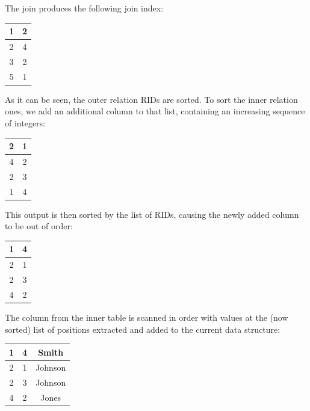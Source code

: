 \noindent The join produces the following join index:
\begin{table}[H]
    \centering
    \begin{tabular}{|c||c|}
    \hline
        1 & 2 \\
    \hline
        2 & 4 \\
    \hline
        3 & 2 \\
    \hline
        5 & 1 \\
    \hline
    \end{tabular}
\end{table}
\noindent As it can be seen, the outer relation RIDs are sorted. To sort the inner relation ones, we add an additional column to that list, containing an increasing sequence of integers:
\begin{table}[H]
    \centering
    \begin{tabular}{|c||c|}
    \hline
        2 & 1\\
    \hline
        4 & 2\\
    \hline
        2 & 3\\
    \hline
        1 & 4\\
    \hline
    \end{tabular}
\end{table}
\noindent This output is then sorted by the list of RIDs, causing the newly added column to be out of order:
\begin{table}[H]
    \centering
    \begin{tabular}{|c||c|}
    \hline
        1 & 4\\
    \hline
        2 & 1\\
    \hline
        2 & 3\\
    \hline
        4 & 2\\
    \hline
    \end{tabular}
\end{table}
\noindent The column from the inner table is scanned in order with values at the (now sorted) list of positions extracted and added to the current data structure:
\begin{table}[H]
    \centering
    \begin{tabular}{|c||c|c|}
    \hline
        1 & 4 & Smith \\
    \hline
        2 & 1 & Johnson \\
    \hline
        2 & 3 & Johnson \\
    \hline
        4 & 2 & Jones \\
    \hline
    \end{tabular}
\end{table}
